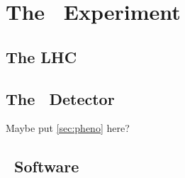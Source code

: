 \chapter{The \atlas\ Experiment}
\section{The LHC}
\section{The \atlas\ Detector}
Maybe put \cref{sec:pheno} here?
\section{\atlas\ Software}
